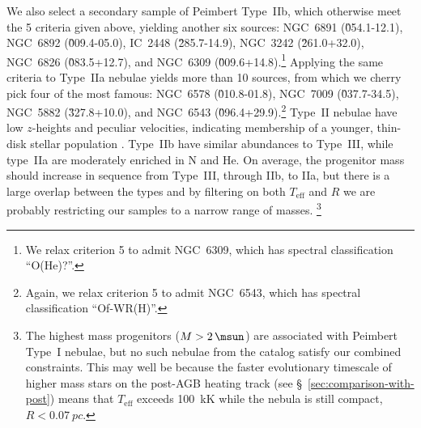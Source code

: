 \documentclass[useAMS, usenatbib]{mnras}
\newcommand{\teff}{\ensuremath{T_\mathrm{eff}}}
\begin{document}
We also select a secondary sample of Peimbert Type~IIb,
which otherwise meet the 5 criteria given above,
yielding another six sources:
NGC~6891 (\G{054.1}{-12.1}), 
NGC~6892 (\G{009.4}{-05.0}), 
 IC~2448  (\G{285.7}{-14.9}), 
NGC~3242 (\G{261.0}{+32.0}), 
NGC~6826 (\G{083.5}{+12.7}),
and NGC~6309 (\G{009.6}{+14.8}).\footnote{
  We relax criterion 5 to admit NGC~6309, which has spectral classification ``O(He)?''.  
}
Applying the same criteria to Type~IIa nebulae yields more than 10 sources,
from which we cherry pick four of the most famous:
NGC~6578 (\G{010.8}{-01.8}), 
NGC~7009 (\G{037.7}{-34.5}), 
NGC~5882 (\G{327.8}{+10.0}), 
and NGC~6543 (\G{096.4}{+29.9}).\footnote{
  Again, we relax criterion 5 to admit NGC~6543, which has spectral classification ``Of-WR(H)''.
} 
Type~II nebulae 
have low \(z\)-heights and peculiar velocities,
indicating membership of a younger, thin-disk stellar population \citep{Quireza:2007a}.
Type~IIb have similar abundances to Type~III,
while type~IIa are moderately enriched in N and He. 
On average, the progenitor mass should increase in sequence from Type~III,
through IIb, to IIa,
but there is a large overlap between the types \citep{Stanghellini:2018a}
and by filtering on both \teff{} and \(R\) we are probably restricting our samples to a narrow range of masses.%
\footnote{
  The highest mass progenitors (\(M > \SI{2}{\msun}\)) are associated with Peimbert Type~I nebulae,
  but no such nebulae from the \citet{Quireza:2007a} catalog satisfy our combined constraints.
  This may well be because the faster evolutionary timescale of higher mass stars on the post-AGB heating track
  (see \S~\ref{sec:comparison-with-post})
  means that \teff{} exceeds \SI{100}{kK} while the nebula is still compact,
  \(R < \SI{0.07}{pc}\).
}
\end{document}
